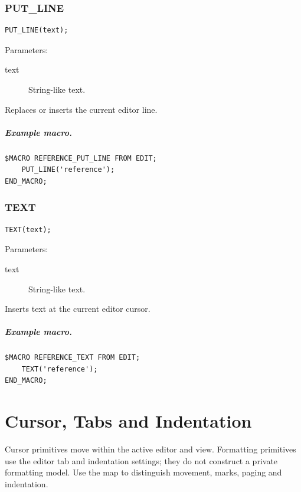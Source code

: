 \documentclass[a4paper,10pt,twoside,openany]{book}
\begin{document}
\label{prim:procedure-put-line}
\subsection*{PUT\_LINE}
\begin{verbatim}
PUT_LINE(text);
\end{verbatim}
Parameters:
\begin{description}
\item[text] String-like text.
\end{description}

Replaces or inserts the current editor line.

\paragraph{Example macro.}
\begin{verbatim}
$MACRO REFERENCE_PUT_LINE FROM EDIT;
    PUT_LINE('reference');
END_MACRO;
\end{verbatim}

\label{prim:procedure-text}
\subsection*{TEXT}
\begin{verbatim}
TEXT(text);
\end{verbatim}
Parameters:
\begin{description}
\item[text] String-like text.
\end{description}

Inserts text at the current editor cursor.

\paragraph{Example macro.}
\begin{verbatim}
$MACRO REFERENCE_TEXT FROM EDIT;
    TEXT('reference');
END_MACRO;
\end{verbatim}


\chapter{Cursor, Tabs and Indentation}

Cursor primitives move within the active editor and view. Formatting primitives use the editor tab and indentation settings; they do not construct a private formatting model. Use the map to distinguish movement, marks, paging and indentation.
\end{document}
